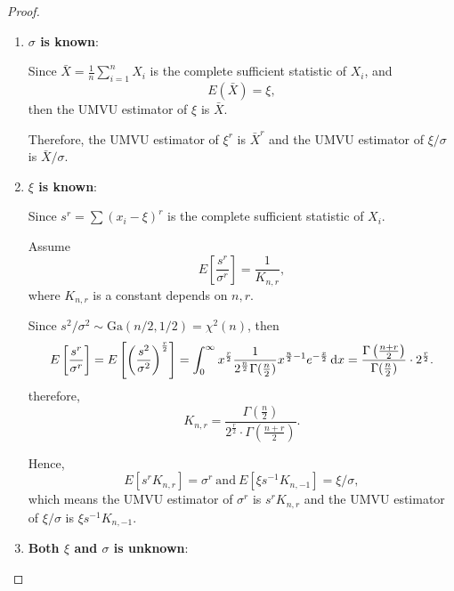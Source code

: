 \begin{proof}
	\begin{enumerate}
		\item \textbf{\(\sigma\) is known}:

		      Since \(\bar{X}=\frac{1}{n}\sum_{i=1}^{n}X_i\) is the complete sufficient statistic of \(X_i\), and
		      \begin{equation*}
			      E(\bar{X})=\xi,
		      \end{equation*}
		      then the UMVU estimator of \(\xi\) is \(\bar{X}\).

		      Therefore, the UMVU estimator of \(\xi^r\) is \(\bar{X}^r\) and the UMVU estimator of \(\xi/\sigma\) is \(\bar{X}/\sigma\).

		\item \textbf{\(\xi\) is known}:

		      Since \(s^r=\sum\left(x_{i}-\xi\right)^r\) is the complete sufficient statistic of \(X_i\).

		      Assume
		      \begin{equation*}
			      E\left[\frac{s^r}{\sigma^r}\right]=\frac{1}{K_{n,r}},
		      \end{equation*}
		      where \(K_{n,r}\) is a constant depends on \(n,r\).

		      Since \(s^2/\sigma^2\sim\text{Ga}(n/2,1/2)=\chi^2(n)\), then
		      \begin{equation*}
			      E\left[\frac{s^r}{\sigma^r}\right]=E\left[\left(\frac{s^2}{\sigma^2}\right)^{\frac{r}{2}}\right]=\int_{0}^{\infty}x^{\frac{r}{2}}\frac{1}{2^{\frac{n}{2}}\Gamma(\frac{n}{2})}x^{\frac{n}{2}-1}e^{-\frac{x}{2}}\mathop{}\!\mathrm{d} x=\frac{\Gamma\left(\frac{n+r}{2}\right)}{\Gamma(\frac{n}{2})}\cdot 2^{\frac{r}{2}}.
		      \end{equation*}
		      therefore,
		      \begin{equation*}
			      K_{n,r}=\frac{\Gamma(\frac{n}{2})}{2^{\frac{r}{2}}\cdot\Gamma\left(\frac{n+r}{2}\right)}.
		      \end{equation*}

		      Hence,
		      \begin{equation*}
			      E\left[s^{r}K_{n,r}\right]=\sigma^r\ \text{and}\ E[\xi s^{-1}K_{n,-1}]=\xi/\sigma,
		      \end{equation*}
		      which means the UMVU estimator of \(\sigma^r\) is \(s^{r}K_{n,r}\) and the UMVU estimator of \(\xi/\sigma\) is \(\xi s^{-1}K_{n,-1}\).

		\item \textbf{Both \(\xi\) and \(\sigma\) is unknown}:


\end{enumerate}
\end{proof}
